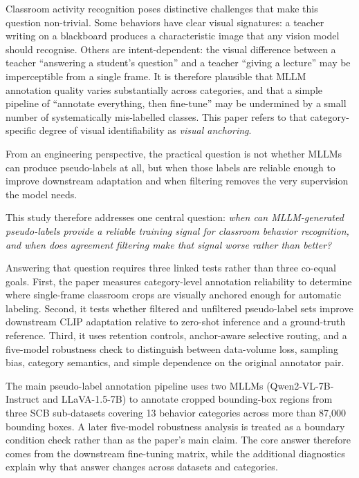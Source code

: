 \documentclass[10pt,letterpaper]{article}
\begin{document}
Classroom activity recognition poses distinctive challenges that
make this question non-trivial.
Some behaviors have clear visual signatures: a teacher writing on a
blackboard produces a characteristic image that any vision model should
recognise.
Others are intent-dependent: the visual difference between a teacher
``answering a student's question'' and a teacher ``giving a lecture''
may be imperceptible from a single frame.
It is therefore plausible that MLLM annotation quality varies
substantially across categories, and that a simple pipeline of
``annotate everything, then fine-tune'' may be undermined by a small
number of systematically mis-labelled classes.
This paper refers to that category-specific degree of visual
identifiability as \emph{visual anchoring}.

From an engineering perspective, the practical question is not whether
MLLMs can produce pseudo-labels at all, but when those labels are
reliable enough to improve downstream adaptation and when filtering
removes the very supervision the model needs.

This study therefore addresses one central question:
\emph{when can MLLM-generated pseudo-labels provide a reliable training
signal for classroom behavior recognition, and when does agreement
filtering make that signal worse rather than better?}

Answering that question requires three linked tests rather than three
co-equal goals.
First, the paper measures category-level annotation reliability to
determine where single-frame classroom crops are visually anchored
enough for automatic labeling.
Second, it tests whether filtered and unfiltered pseudo-label sets
improve downstream CLIP adaptation relative to zero-shot inference and
a ground-truth reference.
Third, it uses retention controls, anchor-aware selective routing, and
a five-model robustness check to distinguish between data-volume loss,
sampling bias, category semantics, and simple dependence on the
original annotator pair.

The main pseudo-label annotation pipeline uses two MLLMs
(Qwen2-VL-7B-Instruct and LLaVA-1.5-7B) to annotate cropped
bounding-box regions from three SCB sub-datasets covering 13 behavior
categories across more than 87{,}000 bounding boxes.
A later five-model robustness analysis is treated as a boundary
condition check rather than as the paper's main claim.
The core answer therefore comes from the downstream fine-tuning matrix,
while the additional diagnostics explain why that answer changes across
datasets and categories.
\end{document}
